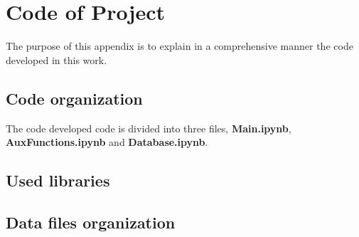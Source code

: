 \chapter{Code of Project}
\label{chapter:appendixA}


The purpose of this appendix is to explain in a comprehensive manner the code developed in this work. 

\section{Code organization}
The code developed code is divided into three files, \textbf{Main.ipynb}, \textbf{AuxFunctions.ipynb} and \textbf{Database.ipynb}.

\section{Used libraries}

\section{Data files organization}